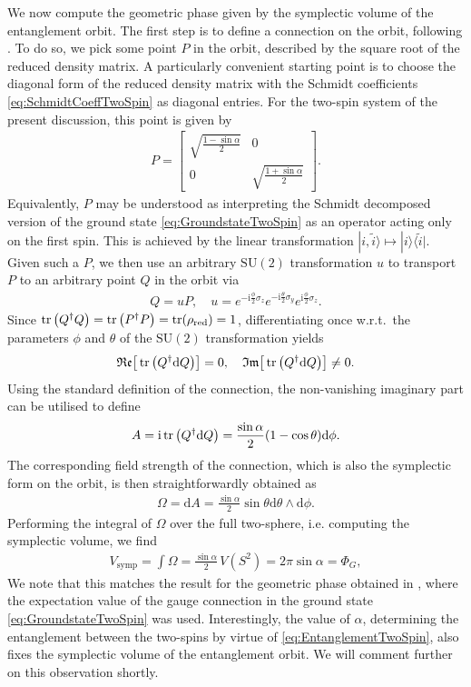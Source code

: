 \documentclass[a4paper,11pt]{article}
\renewcommand{\i}{\text{i}}
\renewcommand{\d}{\text{d}}
\newcommand{\SU}{\text{SU}}
\newcommand{\1}{\mathds{1}}
\begin{document}
We now compute the geometric phase given by the symplectic volume of the entanglement orbit. The first step is to define a connection on the orbit, following \cite{Bengtsson:2001yd}. To do so, we pick some point $P$ in the orbit, described by the square root of the reduced density matrix. A particularly convenient starting point is to choose the diagonal form of the reduced density matrix with the Schmidt coefficients \eqref{eq:SchmidtCoeffTwoSpin} as diagonal entries. For the two-spin system of the present discussion, this point is given by
\begin{align}
    P=\begin{bmatrix}\sqrt{\frac{1-\sin\alpha}{2}}&0\\0&\sqrt{\frac{1+\sin\alpha}{2}}\end{bmatrix}.
\end{align}
Equivalently, $P$ may be understood as interpreting the Schmidt decomposed version of the ground state \eqref{eq:GroundstateTwoSpin} as an operator acting only on the first spin. This is achieved by the linear transformation $|i,\tilde{i}\rangle\mapsto|i\rangle\langle\tilde{i}|$. Given such a $P$, we then use an arbitrary $\SU(2)$ transformation $u$ to transport $P$ to an arbitrary point $Q$ in the orbit via
\begin{align}
    Q=uP,\quad u=e^{-\i\frac{\phi}{2}\sigma_z}e^{-\i\frac{\theta}{2}\sigma_y}e^{\i\frac{\phi}{2}\sigma_z}.\label{eq:DefQandu}
\end{align}
Since $\tr\big(Q^\dagger Q\big)=\tr\big(P^\dagger P\big)=\tr(\rho_{\text{red}})=1$, differentiating once w.r.t.~the parameters $\phi$ and $\theta$ of the $\SU(2)$ transformation yields
\begin{align}
    \mathfrak{Re}\big[\tr\big(Q^\dagger\d Q\big)\big]=0,\quad\mathfrak{Im}\big[\tr\big(Q^\dagger\d Q\big)\big]\neq0.
\end{align}
Using the standard definition of the connection, the non-vanishing imaginary part can be utilised to define
\begin{align}
    A=\i\tr\big(Q^\dagger\d Q\big)=\frac{\sin\alpha}{2}(1-\cos\theta)\d\phi.
\end{align}
The corresponding field strength of the connection, which is also the symplectic form on the orbit, is then straightforwardly obtained as
\begin{align}
    \Omega=\d A=\frac{\sin\alpha}{2}\sin\theta\d\theta\wedge\d\phi.\label{eq:SympForm}
\end{align}
Performing the integral of $\Omega$ over the full two-sphere, i.e. computing the symplectic volume, we find
\begin{align}
    V_{\text{symp}}=\int\Omega=\frac{\sin\alpha}{2}\,V(S^2)=2\pi\sin\alpha=\Phi_G,\label{eq:SympVolume}
\end{align}
We note that this matches the result for the geometric phase obtained in \cite{Nogueira:2021ngh}, where the expectation value of the gauge connection in the ground state \eqref{eq:GroundstateTwoSpin} was used. Interestingly, the value of $\alpha$, determining the entanglement between the two-spins by virtue of \eqref{eq:EntanglementTwoSpin}, also fixes the symplectic volume of the entanglement orbit. We will comment further on this observation shortly.
\end{document}

